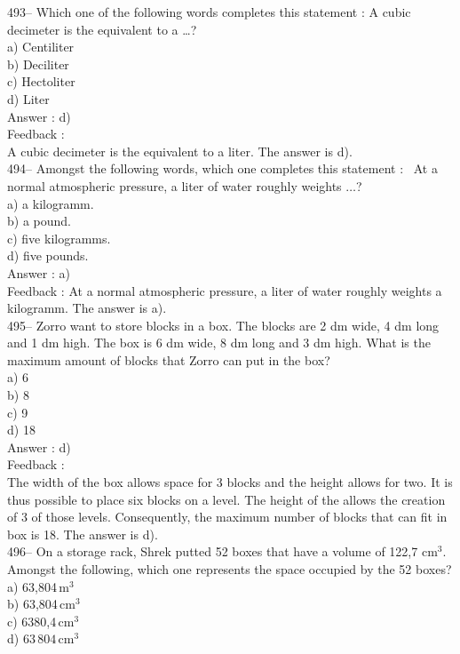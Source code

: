 ﻿\documentclass[letterpaper, 12pt]{article}
\begin{document}
493--  Which one of the following words completes this statement : \og A cubic decimeter is the equivalent to a \ldots\fg ?\\
a) Centiliter\\
b) Deciliter\\
c) Hectoliter\\
d) Liter\\

Answer : d)\\

Feedback : \\
A cubic decimeter is the equivalent to a liter.  The answer is d).\\

494-- Amongst the following words, which one completes this statement : \og\ At a normal atmospheric pressure, a liter of water roughly weights $\ldots$\fg ?\\
a) a kilogramm.\\
b) a pound.\\
c) five kilogramms.\\
d) five pounds.\\

Answer : a)\\

Feedback :
At a normal atmospheric pressure, a liter of water roughly weights a kilogramm.  The answer is a).\\

495-- Zorro want to store blocks in a box. The blocks are 2 dm wide, 4 dm long and 1 dm high. The box is 6 dm wide, 8 dm long and 3 dm high. What is the maximum amount of blocks that Zorro can put in the box?\\
a) 6\\
b) 8\\
c) 9\\
d) 18\\

Answer : d)\\

Feedback : \\
The width of the box allows space for 3 blocks and the height allows for two. It is thus possible to place six blocks on a level. The height of the allows the creation of 3 of those levels. Consequently, the maximum number of blocks that can fit in box is 18.  The answer is d).\\

496-- On a storage rack, Shrek putted 52 boxes that have a volume of 122,7 cm$^{3}$.  Amongst the following,
which one represents the space occupied by the 52 boxes? \\
a) 63,804\,m$^{3}$\\
b) 63,804\,cm$^{3}$\\
c) 6380,4\,cm$^{3}$\\
d) $63\,804$\,cm$^{3}$\\
\end{document}
